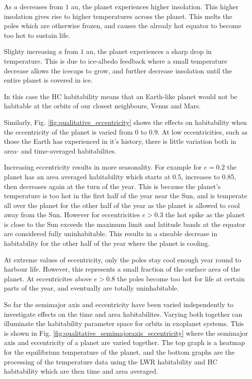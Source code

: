 \documentclass[12pt, onecolumn]{revtex4-2}    %
\begin{document}
As $a$ decreases from $1$ au, the planet experiences higher insolation.
This higher insolation gives rise to higher temperatures across the planet.
This melts the poles which are otherwise frozen, and causes the already hot equator to become too hot to sustain life.

Slighty increasing $a$ from $1$ au, the planet experiences a sharp drop in temperature.
This is due to ice-albedo feedback where a small temperature decrease allows the icecaps to grow, and further decrease insolation until the entire planet is covered in ice.

In this case the HC habitability means that an Earth-like planet would not be habitable at the orbits of our closest neighbours, Venus and Mars.


Similarly, Fig. \ref{fig:qualitative_eccentricity} shows the effects on habitability when the eccentricity of the planet is varied from $0$ to $0.9$.
At low eccentricities, such as those the Earth has experienced in it's history, there is little variation both in area- and time-averaged habitabilites.

Increasing eccentricity results in more seasonality.
For example for $e=0.2$ the planet has an area averaged habitability which starts at 0.5, increases to 0.85, then decreases again at the turn of the year.
This is because the planet's temperature is too hot in the first half of the year near the Sun, and is temperate all over the planet for the other half of the year as the planet is allowed to cool away from the Sun.
However for eccentricities $e>0.3$ the hot spike as the planet is close to the Sun exceeds the maximum limit and latitude bands at the equator are considered fully uninhabitable.
This results in a sizeable decrease in habitability for the other half of the year where the planet is cooling.

At extreme values of eccentricity, only the poles stay cool enough year round to harbour life.
However, this represents a small fraction of the surface area of the planet.
At eccentricites above $e > 0.8$ the poles become too hot for life at certain parts of the year, and eventually are totally uninhabitable.


So far the semimajor axis and eccentricity have been varied independently to investigate effects on the time and area habitabilites.
Varying both together can illuminate the habitability parameter space for orbits in exoplanet systems.
This is shown in Fig. \ref{fig:qualitative_semimajoraxis_eccentricity} where the semimajor axis and eccentricity of a planet are varied together.
The top graph is a heatmap for the equilibrium temperature of the planet, and the bottom graphs are the processing of the temperature data using the LWR habitability and HC habitability which are then time and area averaged.
\end{document}
